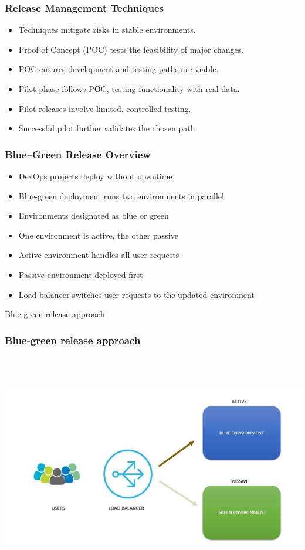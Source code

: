 \documentclass[aspectratio=169, table]{beamer}
\begin{document}
\begin{frame}
	\frametitle{Release Management Techniques}
	\begin{itemize}
		\item Techniques mitigate risks in stable environments.
		\item Proof of Concept (POC) tests the feasibility of major changes.
		\item POC ensures development and testing paths are viable.
		\item Pilot phase follows POC, testing functionality with real data.
		\item Pilot releases involve limited, controlled testing.
		\item Successful pilot further validates the chosen path.
	\end{itemize}
\end{frame}

\begin{frame}
	\frametitle{Blue–Green Release Overview}
	\begin{itemize}
		\item DevOps projects deploy without downtime
		\item Blue-green deployment runs two environments in parallel
		\item Environments designated as blue or green
		\item One environment is active, the other passive
		\item Active environment handles all user requests
		\item Passive environment deployed first
		\item Load balancer switches user requests to the updated environment
	\end{itemize}
\end{frame}

\begin{frame}{Blue-green release approach} 	 \frametitle{Blue-green release approach} \begin{center} 	\includegraphics[width=0.8\linewidth]{images/image-03.png} \end{center} \end{frame}
\end{document}
